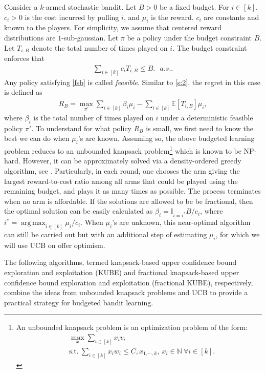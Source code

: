 \documentclass[letterpaper,11pt,openright,openany]{book}
\numberwithin{equation}{section}
\theoremstyle{plain}
\theoremstyle{definition}
\def\N{{\mathbb N}}
\def\E{{\mathbb E}}
\DeclareMathOperator*{\argmax}{arg\,max}
\begin{document}
Consider a $k$-armed stochastic bandit. Let $B>0$ be a fixed budget. For $i\in [k]$, $c_i>0$ is the cost incurred by pulling $i$, and $\mu_i$ is the reward. $c_i$ are constants and known to the players. For simplicity,  we assume that centered reward distributions are $1$-sub-gaussian. Let $\pi$ be a policy under the budget constraint $B$. Let $T_{i,B}$ denote the total number of times played on $i$. The budget constraint enforces that 
\begin{align}
\sum_{i\in [k]}c_iT_{i,B}\leq B. \ \ \ a.s..\label{fsb}
\end{align}
Any policy satisfying \eqref{fsb} is called \emph{feasible}. Similar to \eqref{s:2}, the regret in this case is defined as 
\begin{align*}
R_B = \max_{\pi'}\sum_{i\in [k]}\beta_i\mu_i-\sum_{i\in [k]}\E[T_{i,B}]\mu_i,
\end{align*}
where $\beta_i$ is the total number of times played on $i$ under a deterministic feasible policy $\pi'$. To understand for what policy $R_B$ is small, we first need to know the best we can do when $\mu_i$'s are known. Assuming so, the above budgeted learning problem reduces to an unbounded knapsack problem\footnote{An unbounded knapsack problem is an optimization problem of the form:
\begin{align*}
&\max_x\sum_{i\in [k]}x_iv_i\\
&\text{s.t.}\ \sum_{i\in [k]}x_iw_i\leq C, x_{1, \cdots, k}, \ x_i\in\N\  \forall i\in [k]. 
\end{align*}}
which is known to be NP-hard. However, it can be approximately solved via a density-ordered greedy algorithm, see \cite{Kohli_2004}. Particularly, in each round, one chooses the arm giving the largest reward-to-cost ratio among all arms that could be played using the remaining budget, and plays it as many times as possible. The process terminates when no arm is affordable. If the solutions are allowed to be be fractional, then the optimal solution can be easily calculated as $\beta_i = \mathbb I_{i=i^*}B/c_i$, where $i^*=\argmax_{i\in [k]}\mu_i/c_i$. When $\mu_i$'s are unknown, this near-optimal algorithm can still be carried out but with an additional step of estimating $\mu_i$, for which we will use UCB on offer optimism. 

The following algorithms, termed knapsack-based upper confidence bound exploration and exploitation (KUBE) and fractional knapsack-based upper confidence bound exploration and exploitation (fractional KUBE), respectively, combine the ideas from unbounded knapsack problems and UCB to provide a practical strategy for budgeted bandit learning. 
\end{document}

